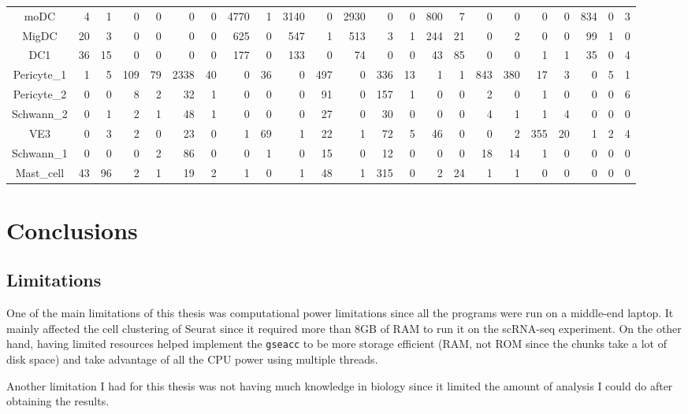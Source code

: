 \documentclass[aps,prb,twocolumn,superscriptaddress,floatfix,longbibliography]{revtex4-2}
\begin{document}
\begin{table}[htb]
\begin{adjustwidth}{-3cm}{-1cm}
\begin{tabular*}{\paperwidth-0.5cm}{| c | @{\hskip 6pt\extracolsep{\stretch{1}}}*{22}{r} |}
  moDC &   4 &   1 &   0 &   0 &   0 &   0 & 4770 &   1 & 3140 &   0 & 2930 &   0 &   0 & 800 &   7 &   0 &   0 &   0 &   0 & 834 &   0 &   3 \\
  MigDC &  20 &   3 &   0 &   0 &   0 &   0 & 625 &   0 & 547 &   1 & 513 &   3 &   1 & 244 &  21 &   0 &   2 &   0 &   0 &  99 &   1 &   0 \\
  DC1 &  36 &  15 &   0 &   0 &   0 &   0 & 177 &   0 & 133 &   0 &  74 &   0 &   0 &  43 &  85 &   0 &   0 &   1 &   1 &  35 &   0 &   4 \\
  Pericyte\_1 &   1 &   5 & 109 &  79 & 2338 &  40 &   0 &  36 &   0 & 497 &   0 & 336 &  13 &   1 &   1 & 843 & 380 &  17 &   3 &   0 &   5 &   1 \\
  Pericyte\_2 &   0 &   0 &   8 &   2 &  32 &   1 &   0 &   0 &   0 &  91 &   0 & 157 &   1 &   0 &   0 &   2 &   0 &   1 &   0 &   0 &   0 &   6 \\
  Schwann\_2 &   0 &   1 &   2 &   1 &  48 &   1 &   0 &   0 &   0 &  27 &   0 &  30 &   0 &   0 &   0 &   4 &   1 &   1 &   4 &   0 &   0 &   0 \\
  VE3 &   0 &   3 &   2 &   0 &  23 &   0 &   1 &  69 &   1 &  22 &   1 &  72 &   5 &  46 &   0 &   0 &   2 & 355 &  20 &   1 &   2 &   4 \\
  Schwann\_1 &   0 &   0 &   0 &   2 &  86 &   0 &   0 &   1 &   0 &  15 &   0 &  12 &   0 &   0 &   0 &  18 &  14 &   1 &   0 &   0 &   0 &   0 \\
  Mast\_cell &  43 &  96 &   2 &   1 &  19 &   2 &   1 &   0 &   1 &  48 &   1 & 315 &   0 &   2 &  24 &   1 &   1 &   0 &   0 &   0 &   0 &   0 \\
  \hline
\end{tabular*}
\end{adjustwidth}
\label{tab:clustercounts}
\end{table}

\section{Conclusions}

\subsection{Limitations}

One of the main limitations of this thesis was computational power limitations since all the programs were run on a middle-end laptop. It mainly affected the cell clustering of Seurat since it required more than 8GB of RAM to run it on the scRNA-seq experiment. On the other hand, having limited resources helped implement the \texttt{gseacc} to be more storage efficient (RAM, not ROM since the chunks take a lot of disk space) and take advantage of all the CPU power using multiple threads.

Another limitation I had for this thesis was not having much knowledge in biology since it limited the amount of analysis I could do after obtaining the results.


\end{document}
